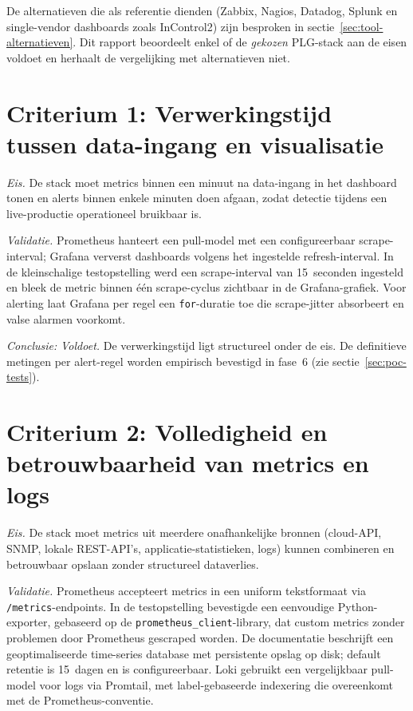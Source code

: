 De alternatieven die als referentie dienden (Zabbix, Nagios, Datadog, Splunk en single-vendor dashboards zoals InControl2) zijn besproken in sectie~\ref{sec:tool-alternatieven}. Dit rapport beoordeelt enkel of de \emph{gekozen} PLG-stack aan de eisen voldoet en herhaalt de vergelijking met alternatieven niet.

\section*{Criterium 1: Verwerkingstijd tussen data-ingang en visualisatie}

\emph{Eis.} De stack moet metrics binnen een minuut na data-ingang in het dashboard tonen en alerts binnen enkele minuten doen afgaan, zodat detectie tijdens een live-productie operationeel bruikbaar is.

\emph{Validatie.} Prometheus hanteert een pull-model met een configureerbaar scrape-interval; Grafana ververst dashboards volgens het ingestelde refresh-interval. In de kleinschalige testopstelling werd een scrape-interval van 15~seconden ingesteld en bleek de metric binnen één scrape-cyclus zichtbaar in de Grafana-grafiek. Voor alerting laat Grafana per regel een \texttt{for}-duratie toe die scrape-jitter absorbeert en valse alarmen voorkomt.

\emph{Conclusie:} \emph{Voldoet.} De verwerkingstijd ligt structureel onder de eis. De definitieve metingen per alert-regel worden empirisch bevestigd in fase~6 (zie sectie~\ref{sec:poc-tests}).

\section*{Criterium 2: Volledigheid en betrouwbaarheid van metrics en logs}

\emph{Eis.} De stack moet metrics uit meerdere onafhankelijke bronnen (cloud-API, SNMP, lokale REST-API's, applicatie-statistieken, logs) kunnen combineren en betrouwbaar opslaan zonder structureel dataverlies.

\emph{Validatie.} Prometheus accepteert metrics in een uniform tekstformaat via \texttt{/metrics}-endpoints. In de testopstelling bevestigde een eenvoudige Python-exporter, gebaseerd op de \texttt{prometheus\_client}-library, dat custom metrics zonder problemen door Prometheus gescraped worden. De documentatie beschrijft een geoptimaliseerde time-series database met persistente opslag op disk; default retentie is 15~dagen en is configureerbaar. Loki gebruikt een vergelijkbaar pull-model voor logs via Promtail, met label-gebaseerde indexering die overeenkomt met de Prometheus-conventie.


